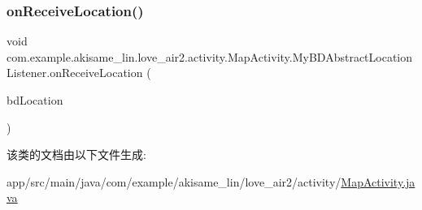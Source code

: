 \subsubsection{\texorpdfstring{onReceiveLocation()}{onReceiveLocation()}}
{\footnotesize\ttfamily void com.\+example.\+akisame\+\_\+lin.\+love\+\_\+air2.\+activity.\+Map\+Activity.\+My\+B\+D\+Abstract\+Location\+Listener.\+on\+Receive\+Location (\begin{DoxyParamCaption}\item[{B\+D\+Location}]{bd\+Location }\end{DoxyParamCaption})\hspace{0.3cm}{\ttfamily [inline]}}



该类的文档由以下文件生成\+:\begin{DoxyCompactItemize}
\item 
app/src/main/java/com/example/akisame\+\_\+lin/love\+\_\+air2/activity/\mbox{\hyperlink{_map_activity_8java}{Map\+Activity.\+java}}\end{DoxyCompactItemize}
